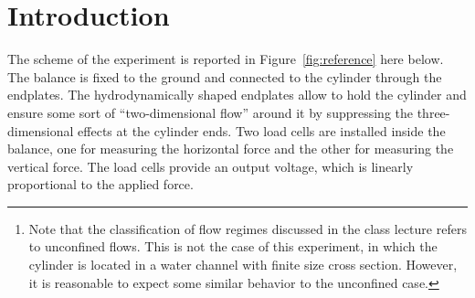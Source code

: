 \documentclass[12pt]{article}
\begin{document}
\maketitle

\begin{abstract}

        Goal of this test case is to investigate the drag and lift forces acting on a cylinder submerged in a steady-state free-surface water flow. The experiments have been performed in the water channel facility of the Hydraulics Laboratory, and the two force components (horizontal and vertical) have been measured through a balance. In the case study proposed, the Reynolds number of the cylinder $Re=DU_\infty/\nu$ is within the range of the “sub-critical regime”\footnote{Note that the classification of flow regimes discussed in the class lecture refers to unconfined flows. This is not the case of this experiment, in which the cylinder is located in a water channel with finite size cross section. However, it is reasonable to expect some similar behavior to the unconfined case.}; therefore, it will be not surprising to notice that the flow separates at a certain distance from the front stagnation point, causing a recirculation zone behind it, and that an oscillating wake is created by the shedding of two counter-rotating vortexes. As a result, also drag and lift will show an oscillating behavior.\cite{FL:07}

\end{abstract}

\section{Introduction}

        The scheme of the experiment is reported in Figure~\ref{fig:reference} here below. The balance is fixed to the ground and connected to the cylinder through the endplates. The hydrodynamically shaped endplates allow to hold the cylinder and ensure some sort of “two-dimensional flow” around it by suppressing the three-dimensional effects at the cylinder ends. Two load cells are installed inside the balance, one for measuring the horizontal force and the other for measuring the vertical force. The load cells provide an output voltage, which is linearly proportional to the applied force.
\end{document}
